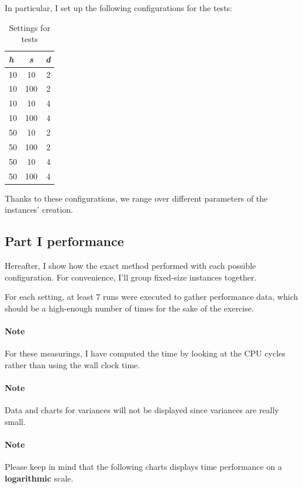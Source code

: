 In particular, I set up the following configurations for the tests:

\begin{table}[H]
  \centering
  \begin{tabular}{|l|c|r|}
    \hline
    \textbf{\textit{h}} & \textbf{\textit{s}} & \textbf{\textit{d}} \\
    \hline
    \hline
    10 & 10  & 2 \\
    \hline
    10 & 100 & 2 \\
    \hline
    10 & 10  & 4 \\
    \hline
    10 & 100 & 4 \\
    \hline
    50 & 10  & 2 \\
    \hline
    50 & 100 & 2 \\
    \hline
    50 & 10  & 4 \\
    \hline
    50 & 100 & 4 \\
    \hline
  \end{tabular}
  \caption{Settings for tests}
  \label{tab:settings}
\end{table}

Thanks to these configurations, we range over different parameters of the
instances' creation.

\subsection{Part I performance}

Hereafter, I show how the exact method performed with each possible
configuration. For convenience, I'll group fixed-size instances together.

For each setting, at least 7 runs were executed to gather performance data,
which should be a high-enough number of times for the sake of the exercise.

\paragraph{Note} For these measurings, I have computed the time by looking at
the CPU cycles rather than using the wall clock time.

\paragraph{Note} Data and charts for variances will not be displayed since
variances are really small.

\paragraph{Note} Please keep in mind that the following charts displays time
performance on a \textbf{logarithmic} scale.

